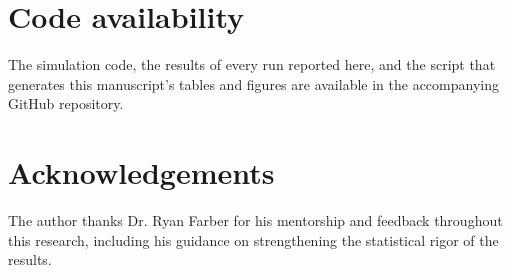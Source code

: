 \documentclass[11pt]{article}
\begin{document}
\section*{Code availability}

The simulation code, the results of every run reported here, and the script that generates this manuscript's tables and figures are available in the accompanying GitHub repository.

\section*{Acknowledgements}

The author thanks Dr. Ryan Farber for his mentorship and feedback throughout this research, including his guidance on strengthening the statistical rigor of the results.
\end{document}
